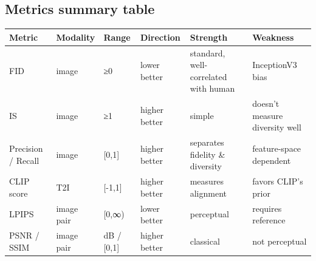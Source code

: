 \subsection{Metrics summary table}\label{metrics-summary-table}

{\def\LTcaptype{none} %
\begin{longtable}[]{@{}
  >{\raggedright\arraybackslash}p{}
  >{\raggedright\arraybackslash}p{}
  >{\raggedright\arraybackslash}p{}
  >{\raggedright\arraybackslash}p{}
  >{\raggedright\arraybackslash}p{}
  >{\raggedright\arraybackslash}p{}@{}}
\toprule\noalign{}
\begin{minipage}[b]{\linewidth}\raggedright
Metric
\end{minipage} & \begin{minipage}[b]{\linewidth}\raggedright
Modality
\end{minipage} & \begin{minipage}[b]{\linewidth}\raggedright
Range
\end{minipage} & \begin{minipage}[b]{\linewidth}\raggedright
Direction
\end{minipage} & \begin{minipage}[b]{\linewidth}\raggedright
Strength
\end{minipage} & \begin{minipage}[b]{\linewidth}\raggedright
Weakness
\end{minipage} \\
\midrule\noalign{}
\endhead
\bottomrule\noalign{}
\endlastfoot
FID & image & ≥0 & lower better & standard, well-correlated with human & InceptionV3 bias \\
IS & image & ≥1 & higher better & simple & doesn't measure diversity well \\
Precision / Recall & image & {[}0,1{]} & higher better & separates fidelity \& diversity & feature-space dependent \\
CLIP score & T2I & {[}-1,1{]} & higher better & measures alignment & favors CLIP's prior \\
LPIPS & image pair & {[}0,∞) & lower better & perceptual & requires reference \\
PSNR / SSIM & image pair & dB / {[}0,1{]} & higher better & classical & not perceptual \\

\end{longtable}}
